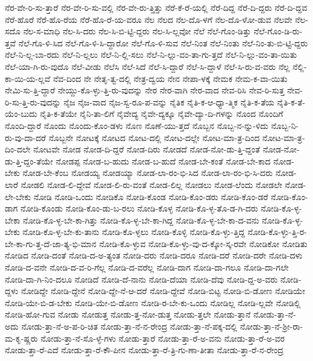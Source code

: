 {ನೆರ-ವೇ-ರಿ-ಸು-ತ್ತಾರೆ
ನೆರ-ವೇ-ರಿ-ಸು-ವಲ್ಲಿ
ನೆರ-ವೇ-ರು-ತ್ತಿತ್ತು
ನೆರೆ-ಕೆ-ರೆ-ಯಲ್ಲಿ
ನೆರೆ-ದಿದ್ದ
ನೆರೆ-ದಿ-ದ್ದರು
ನೆರೆ-ದಿ-ದ್ದವ
ನೆರೆ-ಹೊರೆ
ನೆರೆ-ಹೊ-ರೆಯ
ನೆರೆ-ಹೊ-ರೆ-ಯ-ವರೂ
ನೆಲ
ನೆಲದ
ನೆಲ-ದೊ-ಳಗೆ
ನೆಲ-ದೊ-ಳೋ-ಡುವ
ನೆಲವೇ
ನೆಲ-ಸದೊ
ನೆಲ-ಸ-ಮಾಧಿ
ನೆಲ-ಸಿ-ದರು
ನೆಲ-ಸಿ-ಬಿ-ಟ್ಟಿ-ದ್ದರು
ನೆಲ-ಸಿ-ಲ್ಲವೋ
ನೆಲೆ
ನೆಲೆ-ಗೊಂ-ಡಿತ್ತು
ನೆಲೆ-ಗೊಂ-ಡಿ-ರು-ತ್ತವೆ
ನೆಲೆ-ಗೊ-ಳಿ-ಸಿದ
ನೆಲೆ-ಗೊ-ಳಿ-ಸಿ-ದ್ದಾರೋ
ನೆಲೆ-ಗೊ-ಳಿ-ಸುವ
ನೆಲೆ-ನಿಂತ
ನೆಲೆ-ನಿಂತು
ನೆಲೆ-ನಿಂ-ತು-ಬಿ-ಟ್ಟಿ-ದ್ದರು
ನೆಲೆ-ನಿ-ಲ್ಲ-ಬಾ-ರದು
ನೆಲೆ-ನಿ-ಲ್ಲಲು
ನೆಲೆ-ನಿ-ಲ್ಲಿ-ಸಲು
ನೆಲೆ-ನಿ-ಲ್ಲು-ವಂ-ತಾ-ಗು-ತ್ತದೆ
ನೆಲೆ-ನಿ-ಲ್ಲು-ವಂ-ತಾ-ಯಿತು
ನೆಲೆ-ಯಾ-ಗಿ-ರು-ವುದೊ
ನೆಲೆ-ವೀಡು
ನೆಲೆಸಿ
ನೆಲೆ-ಸಿದೆ
ನೆಲೆ-ಸಿ-ದ್ದಾರೆ
ನೆಲೆ-ಸಿ-ದ್ದಾಳೆ
ನೆಲೆ-ಸಿ-ರು-ವ-ವರು
ನೆಲ್ಲ
ನೆಲ್ಲಿ-ಕಾ-ಯಿ-ಯ-ಲ್ಲವೆ
ನೆವ-ದಿಂದ
ನೇ
ನೇತೃ-ತ್ವ-ದಲ್ಲಿ
ನೇತ್ರ-ದ್ವಯ
ನೇನ
ನೇಪಾ-ಳಕ್ಕೆ
ನೇಮಕ
ನೇಮ-ಕ-ವಾ-ಯಿತು
ನೇಮಿ-ಸು-ತ್ತಿ-ದ್ದಾರೆ
ನೇಯ್ದು-ಕೊ-ಳ್ಳು-ತ್ತಿ-ರು-ವುದನ್ನು
ನೇರ
ನೇರ-ವಾಗಿ
ನೇರ-ವಾದ
ನೇವ-ರಿಸಿ
ನೇವ-ರಿ-ಸುತ್ತ
ನೇವ-ರಿ-ಸು-ತ್ತಿ-ರು-ವುದನ್ನು
ನೈಜ
ನೈಜ-ವಾದ
ನೈಜ-ಸ್ವ-ರೂ-ಪ-ವನ್ನು
ನೈತಿಕ
ನೈತಿ-ಕ-ಆ-ಧ್ಯಾ-ತ್ಮಿಕ
ನೈತಿ-ಕ-ತೆಯ
ನೈತಿ-ಕ-ತೆ-ಯೆಂ-ಬುದು
ನೈತಿ-ಕ-ತೆಯೇ
ನೈನಿ-ತಾ-ಲಿಗೆ
ನೈವೇದ್ಯ
ನೈವೇ-ದ್ಯಕ್ಕೂ
ನೈವೇ-ದ್ಯಾ-ದಿ-ಗಳನ್ನು
ನೊಂದ
ನೊಂದಿಗೆ
ನೊಂದಿ-ದ್ದಾರೆ
ನೊಂದು
ನೊಂದು-ಕೊಂ-ಡಳು
ನೊಣ
ನೊಣೆ-ಯು-ತ್ತದೆ
ನೊಬ್ಬನ
ನೊಬ್ಬ-ನ-ನ್ನು-ಳಿದು
ನೊಬ್ಬ-ನಿ-ರು-ವು-ದಾ-ದರೆ
ನೊಬ್ಬನೇ
ನೋಟಕ್ಕೆ
ನೋಟದ
ನೋಟ-ದಲ್ಲಿ
ನೋಟ-ದಲ್ಲೇ
ನೋಟ-ಮಾ-ತ್ರ-ದಿಂದ
ನೋಟ-ಮಾ-ತ್ರ-ದಿಂ-ದಲೇ
ನೋಟವೇ
ನೋಡ
ನೋಡ-ದಿ-ದ್ದರೆ
ನೋಡ-ದಿರು
ನೋಡದೆ
ನೋಡ-ನೋ-ಡು-ತ್ತಿ-ದ್ದಂತೆ
ನೋಡ-ನೋ-ಡು-ತ್ತಿ-ದ್ದಂ-ತೆಯೇ
ನೋಡಪ್ಪ
ನೋಡ-ಬ-ಹುದು
ನೋಡ-ಬ-ಹುದೆ
ನೋಡ-ಬೇ-ಕಂತೆ
ನೋಡ-ಬೇ-ಕಾದ
ನೋಡ-ಬೇಕು
ನೋಡ-ಬೇ-ಕೆಂಬ
ನೋಡಯ್ಯ
ನೋಡಯ್ಯಾ
ನೋಡ-ಲಾ-ರಂ-ಭಿ-ಸಿದ
ನೋಡ-ಲಾ-ರಂ-ಭಿ-ಸಿ-ದರು
ನೋಡ-ಲಾರೆ
ನೋಡಲಿ
ನೋಡ-ಲಿ-ದ್ದೇವೆ
ನೋಡ-ಲಿ-ರು-ವಂತೆ
ನೋಡ-ಲಿಲ್ಲ
ನೋಡಲು
ನೋಡ-ಲೆಂದು
ನೋಡಲೇ
ನೋಡ-ಲೇ-ಬೇಕು
ನೋಡಿ
ನೋಡಿ-ಒಂದು
ನೋಡಿಕೊ
ನೋಡಿ-ಕೊಂಡ
ನೋಡಿ-ಕೊಂ-ಡರು
ನೋಡಿ-ಕೊಂ-ಡರೆ
ನೋಡಿ-ಕೊಂ-ಡಾಗ
ನೋಡಿ-ಕೊಂಡು
ನೋಡಿ-ಕೊಂ-ಡು-ಬ-ರಲು
ನೋಡಿ-ಕೊಳ್ಳ
ನೋಡಿ-ಕೊ-ಳ್ಳ-ತೊ-ಡ-ಗಿ-ದರು
ನೋಡಿ-ಕೊ-ಳ್ಳ-ಬೇಕಾ
ನೋಡಿ-ಕೊ-ಳ್ಳ-ಬೇ-ಕಾ-ಗಿತ್ತು
ನೋಡಿ-ಕೊ-ಳ್ಳ-ಬೇ-ಕಾ-ಗಿದ್ದ
ನೋಡಿ-ಕೊ-ಳ್ಳ-ಬೇ-ಕಾ-ದ-ವನು
ನೋಡಿ-ಕೊ-ಳ್ಳ-ಬೇಕು
ನೋಡಿ-ಕೊ-ಳ್ಳ-ಬೇ-ಕು-ತಾನು
ನೋಡಿ-ಕೊ-ಳ್ಳಲು
ನೋಡಿ-ಕೊಳ್ಳಿ
ನೋಡಿ-ಕೊ-ಳ್ಳು-ತ್ತಿದ್ದ
ನೋಡಿ-ಕೊ-ಳ್ಳು-ತ್ತಿ-ರ-ಬೇ-ಕಾ-ಗು-ತ್ತ-ದೆ-ಜಾ-ತ್ಯ-ಭಿ-ಮಾನ
ನೋಡಿ-ಕೊ-ಳ್ಳುವ
ನೋಡಿ-ಕೊ-ಳ್ಳು-ವು-ದ-ಕ್ಕೋ-ಸ್ಕ-ರವೇ
ನೋಡಿಕೋ
ನೋಡಿತು
ನೋಡಿದ
ನೋಡಿ-ದಂತೆ
ನೋಡಿ-ದ-ಅ-ತ್ಯಂತ
ನೋಡಿ-ದರು
ನೋಡಿ-ದರೂ
ನೋಡಿ-ದರೆ
ನೋಡಿ-ದರೇ
ನೋಡಿ-ದಳು
ನೋಡಿ-ದ-ವನೇ
ನೋಡಿ-ದ-ವ-ರಿ-ಗೆಲ್ಲ
ನೋಡಿ-ದ-ವರೆಲ್ಲ
ನೋಡಿ-ದಾಗ
ನೋಡಿ-ದಾ-ಗಲೂ
ನೋಡಿ-ದಾ-ಗಲೇ
ನೋಡಿ-ದಾ-ಗಿ-ನಿಂ-ದಲೂ
ನೋಡಿದೆ
ನೋಡಿ-ದೆ-ನಾನು
ನೋಡಿ-ದೆಯಾ
ನೋಡಿ-ದೆವು
ನೋಡಿ-ದ್ದ-ಅ-ವರು
ನೋಡಿ-ದ್ದಳು
ನೋಡಿದ್ದೇ
ನೋಡಿ-ದ್ದೇನೆ
ನೋಡಿ-ದ್ದೇ-ನೆ-ಆ-ದರೆ
ನೋಡಿ-ದ್ದೇವೆ
ನೋಡಿ-ಬಿಟ್ಟ
ನೋಡಿ-ಬಿ-ಡೋಣ
ನೋಡಿಯೇ
ನೋಡಿ-ಯೇ-ಬಿ-ಡ-ಬೇಕು
ನೋಡಿ-ಯೇ-ಬಿ-ಡೋಣ
ನೋಡಿ-ರ-ಬೇ-ಕು-ಒಂದು
ನೋಡಿಲ್ಲ
ನೋಡಿ-ಲ್ಲವೇ
ನೋಡಿಲ್ಲಿ
ನೋಡಿ-ಹೋ-ಗುವ
ನೋಡು
ನೋಡುತ್ತ
ನೋಡು-ತ್ತ-ನೋ-ಡುತ್ತ
ನೋಡು-ತ್ತಲೇ
ನೋಡು-ತ್ತಾನೆ
ನೋಡು-ತ್ತಾ-ನೆ-ಅದು
ನೋಡು-ತ್ತಾ-ನೆ-ಅ-ಪ-ರಿ-ಚಿತ
ನೋಡು-ತ್ತಾ-ನೆ-ನ-ರೇಂದ್ರ
ನೋಡು-ತ್ತಾ-ನೆ-ಪಕ್ಕ-ದಲ್ಲಿ
ನೋಡು-ತ್ತಾ-ನೆ-ಶ್ರೀ-ರಾ-ಮ-ಕೃ-ಷ್ಣರು
ನೋಡು-ತ್ತಾ-ನೆ-ಸೊ-ಳ್ಳೆ-ಗಳು
ನೋಡು-ತ್ತಾರೆ
ನೋಡು-ತ್ತಾ-ರೆ-ಅ-ವನು
ನೋಡು-ತ್ತಾ-ರೆ-ಅ-ವರ
ನೋಡು-ತ್ತಾ-ರೆ-ಎದೆ
ನೋಡು-ತ್ತಾ-ರೆ-ಕೌ-ಪೀನ
ನೋಡು-ತ್ತಾ-ರೆ-ತ್ರಿ-ಗು-ಣಾ-ತೀತಾ
ನೋಡು-ತ್ತಾ-ರೆ-ನ-ರೇಂದ್ರ
}
